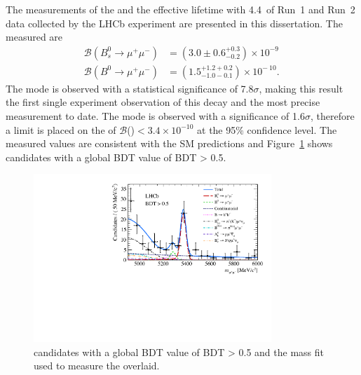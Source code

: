 The measurements of the \bmumu \BFs and the \bsmumu effective lifetime with 4.4~\fb of Run~1 and Run~2 data collected by the LHCb experiment are presented in this dissertation. The measured \BFs are
\begin{equation}
\begin{split}
  \mathcal{B}(B^{0}_{s} \to \mu^{+} \mu^{-}) &= (3.0 \pm 0.6^{+0.3}_{-0.2}) \times 10^{-9\
} \\
  \mathcal{B}(B^{0} \to \mu^{+} \mu^{-}) &= (1.5^{+1.2 +0.2}_{-1.0 -0.1})    \times 10^{-\
10}.
\end{split}
\label{eq:BFresults2}
\end{equation}
The \bs mode is observed with a statistical significance of 7.8$\sigma$, making this result the first single experiment observation of this decay and the most precise measurement to date. The \bd mode is observed with a significance of 1.6$\sigma$, therefore a limit is placed on the \BF of $\mathcal{B}$(\bdmumu)$ < 3.4 \times 10^{-10}$ at the 95$\%$ confidence level. The measured values are consistent with the SM predictions and Figure~\ref{fig:BDT} shows \bmumu candidates with a global BDT value of BDT > 0.5. %
\begin{figure}[tbp]
    \centering
        \includegraphics[width=0.8\textwidth]{./Figs/Summary/BDT_plot.pdf}
    \caption{\bmumu candidates with a global BDT value of BDT > 0.5 and the mass fit used to measure the \bmumu \BFs overlaid.}
    \label{fig:BDT}
\end{figure}

